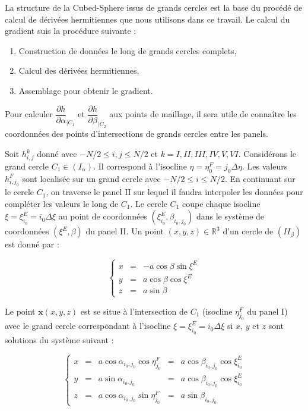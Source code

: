 La structure de la Cubed-Sphere issus de grands cercles est la base du procédé de calcul de dérivées hermitiennes que nous utilisons dans ce travail. Le calcul du gradient suis la procédure suivante :

\begin{enumerate}
\item Construction de données le long de grands cercles complets,
\item Calcul des dérivées hermitiennes,
\item Assemblage pour obtenir le gradient.
\end{enumerate}




Pour calculer $\dfrac{\partial h}{\partial \alpha}_{|C_1}$ et $\dfrac{\partial h}{\partial \beta}_{|C_2}$ aux points de maillage, il sera utile de connaître les coordonnées des points d'intersections de grands cercles entre les panels.

Soit $h_{i,j}^k$ donné avec $-N/2 \leq i,j \leq N/2$ et $k = I, II, III, IV, V, VI$. Considérons le grand cercle $C_1 \in (I_{\alpha})$. Il correspond à l'isocline $\eta = \eta_0^F = j_0 \Delta \eta$. Les valeurs $h_{i,j_0}^F$ sont localisée sur un grand cercle avec $-N/2 \leq i \leq N/2$. En continuant sur le cercle $C_1$, on traverse le panel II sur lequel il faudra interpoler les données pour compléter les valeurs le long de $C_1$. Le cercle $C_1$ coupe chaque isocline $\xi = \xi^E_{i_0} = i_0 \Delta \xi$ au point de coordonnées $(\xi_{i_0}^E, \beta_{i_0,j_0})$ dans le système de coordonnées $(\xi^E, \beta)$ du panel II. Un point $(x,y,z)\in \mathbb{R}^3$ d'un cercle de $(II_{\beta})$ est donné par :

\begin{equation}
\left\lbrace
\begin{array}{rcl}
x & = & - a \cos \beta \sin \xi^E \\
y & = & a \cos \beta \cos \xi^E \\
z & = & a \sin \beta
\end{array}
\right.
\end{equation}

Le point $\mathbf{x}(x,y,z)$ est se situe à l'intersection de $C_1$ (isocline $\eta^F_{j_0}$ du panel I) avec le grand cercle correspondant à l'isocline $\xi = \xi^E_{i_0} = i_0 \Delta \xi$ si $x$, $y$ et $z$ sont solutions du système suivant :

\begin{equation}
\left\lbrace
\begin{array}{rcccl}
x & = & a \cos \alpha_{i_0, j_0} \cos \eta^F_{j_0} & = & a \cos \beta_{i_0, j_0} \cos \xi^E_{i_0} \\
y & = & a \sin \alpha_{i_0, j_0} & = & a \cos \beta_{i_0, j_0} \cos \xi^E_{i_0} \\
z & = & a \cos \alpha_{i_0, j_0} \sin \eta^F_{j_0}  & = & a \sin \beta_{i_0, j_0}
\end{array}
\right.
\end{equation}

